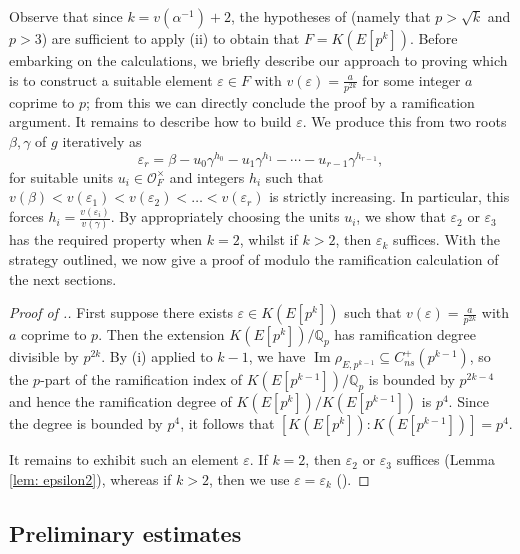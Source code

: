 \documentclass{amsart}
\newcommand{\Qp}{\mathbb{Q}_p}
\theoremstyle{definition}
\numberwithin{theorem}{section}
\numberwithin{equation}{section}
\begin{document}
Observe that since $k=v(\alpha^{-1})+2$, the hypotheses of  (namely that $p>\sqrt{k}$ and $p>3$) are sufficient to apply (ii) to obtain that $F =K(E[p^k])$. Before embarking on the calculations, we briefly describe our approach to proving  which is to construct a suitable element $\varepsilon \in F$ with $v(\varepsilon)=\frac{a}{p^{2k}}$ for some integer $a$ coprime to $p$; from this we can directly conclude the proof by a ramification argument.
It remains to describe how to build $\varepsilon$. We produce this from two roots $\beta, \gamma$ of $g$ iteratively as
\begin{equation}\label{eq: epsilons and hs}
    \varepsilon_r = \beta- u_0\gamma^{h_0} - u_1\gamma^{h_1}- \cdots - u_{r-1}\gamma^{h_{r-1}},
\end{equation}
for suitable units $u_i \in \mathcal{O}_F^\times$ and integers $h_i$ such that $v(\beta)<v(\varepsilon_1)<v(\varepsilon_2)<\ldots<v(\varepsilon_r)$ is strictly increasing. In particular, this forces $h_i=\frac{v(\varepsilon_{i})}{v(\gamma)}$. By appropriately choosing the units $u_i$, we show that $\varepsilon_2$ or $\varepsilon_3$ has the required property when $k=2$, whilst if $k>2$, then $\varepsilon_k$ suffices. With the strategy outlined, we now give a proof of   modulo the ramification calculation of the next sections.

\begin{proof}[Proof of .]
First suppose there exists $\varepsilon \in K(E[p^k])$ such that $v(\varepsilon)=\frac{a}{p^{2k}}$ with $a$ coprime to $p$. Then the extension $K(E[p^k])/\Qp$ has ramification degree divisible by $p^{2k}$.
By (i) applied to $k-1$, we have $\operatorname{Im}\rho_{E,p^{k-1}} \subseteq C_{ns}^+(p^{k-1})$, so the $p$-part of the ramification index of $K(E[p^{k-1}])/\Qp$ is bounded by $p^{2k-4}$ and hence the ramification degree of $K(E[p^k])/K(E[p^{k-1}])$ is $p^4$. Since the degree is bounded by $p^4$, it follows that $[K(E[p^k]) : K(E[p^{k-1}])]=p^4$.

It remains to exhibit such an element $\varepsilon$. If $k=2$, then $\varepsilon_2$ or $\varepsilon_3$ suffices (Lemma \ref{lem: epsilon2}), whereas if $k>2$, then we use $\varepsilon=\varepsilon_k$ ().
\end{proof}


\subsection{Preliminary estimates}
\end{document}
